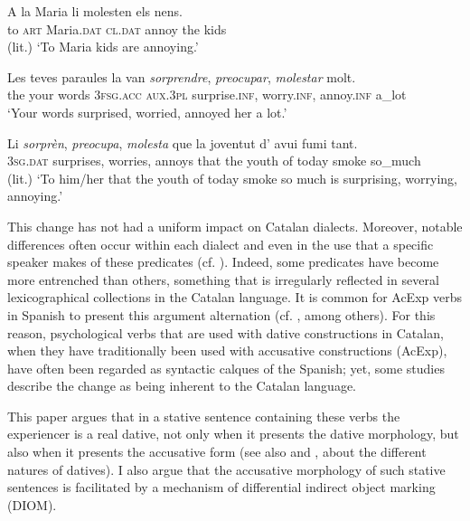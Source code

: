 \documentclass[output=paper,colorlinks,citecolor=brown,nonflat,modfonts]{langsci/langscibook}
\begin{document}
 \ex \label{ex:royo:1b}
 \gll A la Maria li molesten els nens.\\
 to \textsc{art} Maria.\textsc{dat} \textsc{cl.dat} annoy the kids\\
 \glt  (lit.) ‘To Maria kids are annoying.’
 \z
 \z
 
\ea%
 \label{ex:royo:2} \citealt[77]{CabréMateu1998}
 \ea \label{ex:royo:2a}
 \gll Les teves paraules la van \emph{sorprendre}, \emph{preocupar}, \emph{molestar} molt.\\
the  your words     \textsc{3fsg.acc} \textsc{aux.3pl} surprise.\textsc{inf}, worry.\textsc{inf},  annoy.\textsc{inf} a\_lot\\
 \glt ‘Your words surprised, worried, annoyed her a lot.’ 
 
 \ex \label{ex:royo:2b}
 \gll Li \emph{sorprèn}, \emph{preocupa}, \emph{molesta} que la joventut d’ avui fumi tant.\\
\textsc{3sg.dat} surprises, worries,     annoys  that the youth     of today smoke so\_much\\
 \glt	(lit.) ‘To him/her that the youth of today smoke so much is surprising, worrying, annoying.’
 
 \z
 \z
 

This change has not had a uniform impact on Catalan dialects. Moreover, notable differences often occur within each dialect and even in the use that a specific speaker makes of these predicates (cf. \citealt[70]{CabréMateu1998}). Indeed, some predicates have become more entrenched than others, something that is irregularly reflected in several lexicographical collections in the Catalan language. It is common for AcExp verbs in Spanish to present this argument alternation (cf. \citealt{MendivilGiro2005, MarínMcNally2011}, among others). For this reason, psychological verbs that are used with dative constructions in Catalan, when they have traditionally been used with accusative constructions (AcExp), have often been regarded as syntactic calques of the Spanish; yet, some studies describe the change as being inherent to the Catalan language.

This paper argues that in a stative sentence containing these verbs the experiencer is a real dative, not only when it presents the dative morphology, but also when it presents the accusative form (see also  and , about the different natures of datives). I also argue that the accusative morphology of such stative sentences is facilitated by a mechanism of differential indirect object marking (DIOM).
\end{document}
